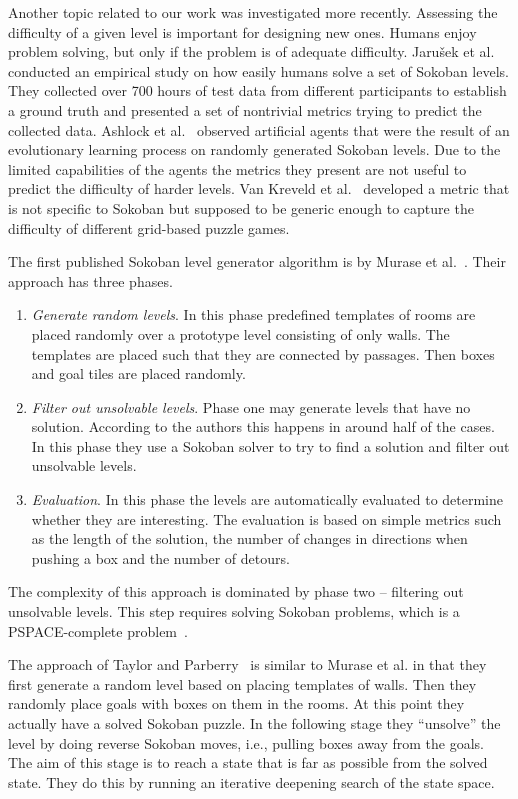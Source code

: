 \documentclass[runningheads]{llncs}
\begin{document}
Another topic related to our work was investigated more recently. Assessing the
difficulty of a given level is important for designing new ones.
Humans enjoy problem solving, but only if the problem is of adequate difficulty.
Jaru{\v s}ek et al.~\cite{jaruvsek2010human}
conducted an empirical study on how easily humans solve a set of Sokoban levels. They collected over 700 hours of test data from different participants to establish a ground truth and presented a set of nontrivial metrics trying to predict the collected data.
Ashlock et al.~\cite{ashlockEvolutionAutomaticAssessment2010}
observed artificial agents that were the result of an evolutionary learning process on randomly generated Sokoban levels. Due to the limited capabilities of the agents the metrics they present are not useful to predict the difficulty of harder levels.
Van Kreveld et al.~\cite{vankreveldAutomatedPuzzleDifficulty2015}
developed a metric that is not specific to Sokoban but supposed to be generic enough to capture the difficulty of different grid-based puzzle games.

The first published Sokoban level generator algorithm is by Murase et al.~\cite{murase1996automatic}.
Their approach has three phases.
\begin{enumerate}
\item \emph{Generate random levels}. In this phase predefined templates of rooms are placed randomly
over a prototype level consisting of only walls.
The templates are placed such that they are connected by passages.
Then boxes and goal tiles are placed randomly.
\item \emph{Filter out unsolvable levels}. Phase one may generate levels that have no solution. According to the authors this happens in around half of the cases. In this phase they use a Sokoban solver to try to find a solution and filter out unsolvable levels.
\item \emph{Evaluation}. In this phase the levels are automatically evaluated to determine whether
they are interesting. The evaluation is based on simple metrics such as the length of the solution, the number of changes in directions when pushing a box and the number of detours.
\end{enumerate}

The complexity of this approach is dominated by phase two -- filtering out unsolvable levels. This
step requires solving Sokoban problems, which is a PSPACE-complete problem~\cite{culberson1997sokoban}.

The approach of Taylor and Parberry~\cite{taylor2011procedural} is similar to Murase et al.
in that they first generate a random level based on placing templates of walls. Then they
randomly place goals with boxes on them in the rooms. At this point they
actually have a solved Sokoban
puzzle. In the following stage they ``unsolve'' the level by doing reverse Sokoban moves, i.e.,
pulling boxes away from the goals. The aim of this stage is to reach a state that is far as
possible from the solved state. They do this by running an iterative deepening search of the
state space.
\end{document}
